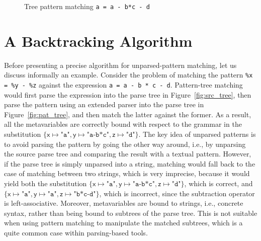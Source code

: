 
\begin{figure}[b]
\caption{Tree pattern matching \texttt{a = a - b*c - d}}
\label{fig:match_ex}
\end{figure}


\section{A Backtracking Algorithm}
\label{backtracking}

Before presenting a precise algorithm for unparsed\hyp{}pattern
matching, let us discuss informally an example. Consider the problem
of matching the pattern \texttt{\%x = \%y - \%z} against the \Clang
expression \texttt{a = a - b * c - d}. Pattern\hyp{}tree matching
would first parse the expression into the parse tree in
Figure~\ref{fig:src_tree}, then parse the pattern using an extended
parser into the parse tree in Figure~\ref{fig:pat_tree}, and then
match the latter against the former. As a result, all the
meta\-variables are correctly bound with respect to the grammar in the
substitution \(\{\textsf{x} \mapsto \texttt{"a"}, \textsf{y} \mapsto
\texttt{"a-b*c"}, \textsf{z} \mapsto \texttt{"d"}\}\). The key idea of
unparsed patterns is to avoid parsing the pattern by going the other
way around, i.e., by unparsing the source parse tree and comparing the
result with a textual pattern. However, if the parse tree is simply
unparsed into a string, matching would fall back to the case of
matching between two strings, which is very imprecise, because it
would yield both the substitution \(\{\textsf{x} \mapsto \texttt{"a"},
\textsf{y} \mapsto \texttt{"a-b*c"}, \textsf{z} \mapsto
\texttt{"d"}\}\), which is correct, and \(\{\textsf{x} \mapsto
\texttt{"a"}, \textsf{y} \mapsto \texttt{"a"}, \textsf{z} \mapsto
\texttt{"b*c-d"}\}\), which is incorrect, since the subtraction
operator is left\hyp{}associative. Moreover, meta\-variables are bound
to strings, i.e., concrete syntax, rather than being bound to subtrees
of the parse tree. This is not suitable when using pattern matching to
manipulate the matched subtrees, which is a quite common case within
parsing\hyp{}based tools.

